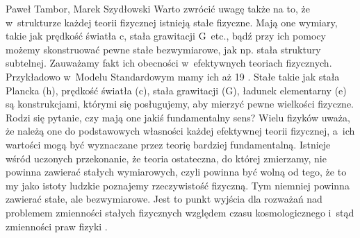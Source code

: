 \begin{artplenv2auth}{Paweł Tambor, Marek Szydłowski}
Warto zwrócić uwagę także na to, że w~strukturze każdej teorii fizycznej istnieją stałe fizyczne. Mają one wymiary, takie jak prędkość światła c, stała grawitacji G~etc., bądź przy ich pomocy możemy skonstruować pewne stałe bezwymiarowe, jak np. stała struktury subtelnej. Zauważamy fakt ich obecności w~efektywnych teoriach fizycznych. Przykładowo w~Modelu Standardowym mamy ich aż 19
\parencite[][]{duff_how_2014}. %
 Stałe takie jak stała Plancka (h), prędkość światła (c), stała grawitacji (G), ładunek elementarny (e) są konstrukcjami, którymi się posługujemy, aby mierzyć pewne wielkości fizyczne. Rodzi się pytanie, czy mają one jakiś fundamentalny sens? Wielu fizyków uważa, że należą one do podstawowych własności każdej efektywnej teorii fizycznej, a~ich wartości mogą być wyznaczane przez teorię bardziej fundamentalną. Istnieje wśród uczonych przekonanie, że teoria ostateczna, do której zmierzamy, nie powinna zawierać stałych wymiarowych, czyli powinna być wolną od tego, że to my jako istoty ludzkie poznajemy rzeczywistość fizyczną. Tym niemniej powinna zawierać stałe, ale bezwymiarowe. Jest to punkt wyjścia dla rozważań nad problemem zmienności stałych fizycznych względem czasu kosmologicznego i~stąd zmienności praw fizyki 
\parencite[][]{volovik_fundamental_2002}.%



\end{artplenv2auth}
